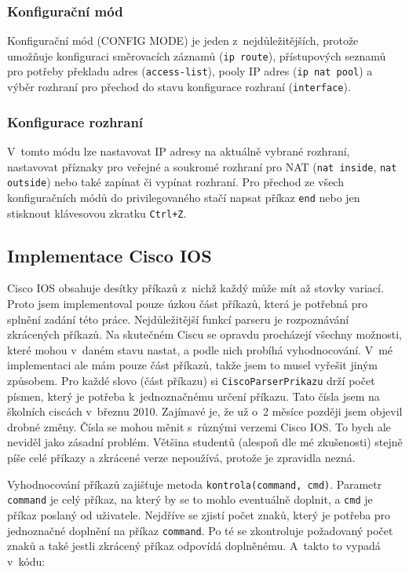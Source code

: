 \subsubsection{Konfigurační mód}
Konfigurační mód (CONFIG MODE) je jeden z~nejdůležitějších, protože umožňuje konfiguraci směrovacích záznamů (\verb|ip route|), přístupových seznamů pro potřeby překladu adres (\verb|access-list|), pooly IP adres (\verb|ip nat pool|) a výběr rozhraní pro přechod do stavu konfigurace rozhraní (\verb|interface|).

\subsubsection{Konfigurace rozhraní} \label{configif}
V~tomto módu lze nastavovat IP adresy na aktuálně vybrané rozhraní, nastavovat příznaky pro veřejné a soukromé rozhraní pro NAT (\verb|nat inside|, \verb|nat outside|) nebo také zapínat či vypínat rozhraní. Pro přechod ze všech konfiguračních módů do privilegovaného stačí napsat příkaz \verb|end| nebo jen stisknout klávesovou zkratku \verb|Ctrl+Z|.


\subsection{Implementace Cisco IOS}
Cisco IOS obsahuje desítky příkazů z~nichž každý může mít až stovky variací. Proto jsem implementoval pouze úzkou část příkazů, která je potřebná pro splnění zadání této práce. Nejdůležitější funkcí parseru je rozpoznávání zkrácených příkazů. Na skutečném Ciscu se opravdu procházejí všechny možnosti, které mohou v~daném stavu nastat, a podle nich probíhá vyhodnocování. V~mé implementaci ale mám pouze část příkazů, takže jsem to musel vyřešit jiným způsobem. Pro každé slovo (část příkazu) si \verb|CiscoParserPrikazu| drží počet písmen, který je potřeba k~jednoznačnému určení příkazu. Tato čísla jsem  na školních ciscách v~březnu 2010. Zajímavé je, že už o~2 měsíce později jsem objevil drobné změny. Čísla se mohou měnit s~různými verzemi Cisco IOS. To bych ale neviděl jako zásadní problém. Většina studentů (alespoň dle mé zkušenosti) stejně píše celé příkazy a zkrácené verze nepoužívá, protože je zpravidla nezná.

Vyhodnocování příkazů zajišťuje metoda \verb|kontrola(command, cmd)|. Parametr \verb|command| je celý příkaz, na který by se to mohlo eventuálně doplnit, a \verb|cmd| je příkaz poslaný od uživatele. Nejdříve se zjistí počet znaků, který je potřeba pro jednoznačné doplnění na příkaz \verb|command|. Po té se zkontroluje požadovaný počet znaků a také jestli zkrácený příkaz odpovídá doplněnému. A~takto to vypadá v~kódu:

